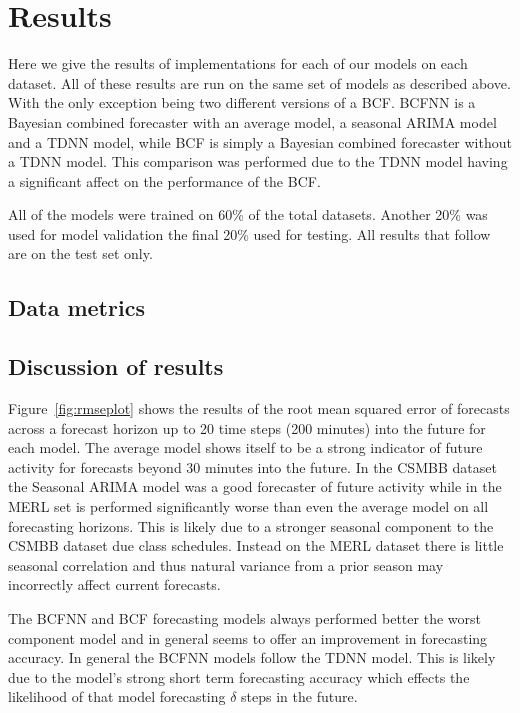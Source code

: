 \documentclass{acm_proc_article-sp}
\begin{document}
\section{Results}

Here we give the results of implementations for each of our models on each dataset.  All of these results are run on the same set of models as described above.  With the only exception being two different versions of a BCF.  BCFNN is a Bayesian combined forecaster with an average model, a seasonal ARIMA model and a TDNN model, while BCF is simply a Bayesian combined forecaster without a TDNN model.  This comparison was performed due to the TDNN model having a significant affect on the performance of the BCF.

All of the models were trained on 60\% of the total datasets.  Another 20\% was used for model validation the final 20\% used for testing.  All results that follow are on the test set only.

\subsection{Data metrics}

\subsection{Discussion of results}
Figure~\ref{fig:rmseplot} shows the results of the root mean squared error of forecasts across a forecast horizon up to 20 time steps (200 minutes) into the future for each model.  The average model shows itself to be a strong indicator of future activity for forecasts beyond 30 minutes into the future.   In the CSMBB dataset the Seasonal ARIMA model was a good forecaster of future activity while in the MERL set is performed significantly worse than even the average model on all forecasting horizons.  This is likely due to a stronger seasonal component to the CSMBB dataset due class schedules.  Instead on the MERL dataset there is little seasonal correlation and thus natural variance from a prior season may incorrectly affect current forecasts.

The BCFNN and BCF forecasting models always performed better the worst component model and in general seems to offer an improvement in forecasting accuracy.  In general the BCFNN models follow the TDNN model.  This is likely due to the model's strong short term forecasting accuracy which effects the likelihood of that model forecasting $\delta$ steps in the future.
\end{document}
